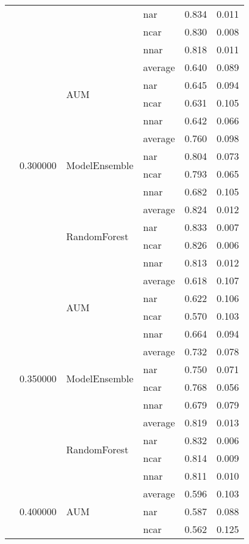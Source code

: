 \begin{longtable}{llllrr}
 &  &  & nar & 0.834 & 0.011 \\
 &  &  & ncar & 0.830 & 0.008 \\
 &  &  & nnar & 0.818 & 0.011 \\
\cline{2-6} \cline{3-6}
 & \multirow[t]{12}{*}{0.300000} & \multirow[t]{4}{*}{AUM} & average & 0.640 & 0.089 \\
 &  &  & nar & 0.645 & 0.094 \\
 &  &  & ncar & 0.631 & 0.105 \\
 &  &  & nnar & 0.642 & 0.066 \\
\cline{3-6}
 &  & \multirow[t]{4}{*}{ModelEnsemble} & average & 0.760 & 0.098 \\
 &  &  & nar & 0.804 & 0.073 \\
 &  &  & ncar & 0.793 & 0.065 \\
 &  &  & nnar & 0.682 & 0.105 \\
\cline{3-6}
 &  & \multirow[t]{4}{*}{RandomForest} & average & 0.824 & 0.012 \\
 &  &  & nar & 0.833 & 0.007 \\
 &  &  & ncar & 0.826 & 0.006 \\
 &  &  & nnar & 0.813 & 0.012 \\
\cline{2-6} \cline{3-6}
 & \multirow[t]{12}{*}{0.350000} & \multirow[t]{4}{*}{AUM} & average & 0.618 & 0.107 \\
 &  &  & nar & 0.622 & 0.106 \\
 &  &  & ncar & 0.570 & 0.103 \\
 &  &  & nnar & 0.664 & 0.094 \\
\cline{3-6}
 &  & \multirow[t]{4}{*}{ModelEnsemble} & average & 0.732 & 0.078 \\
 &  &  & nar & 0.750 & 0.071 \\
 &  &  & ncar & 0.768 & 0.056 \\
 &  &  & nnar & 0.679 & 0.079 \\
\cline{3-6}
 &  & \multirow[t]{4}{*}{RandomForest} & average & 0.819 & 0.013 \\
 &  &  & nar & 0.832 & 0.006 \\
 &  &  & ncar & 0.814 & 0.009 \\
 &  &  & nnar & 0.811 & 0.010 \\
\cline{2-6} \cline{3-6}
 & \multirow[t]{12}{*}{0.400000} & \multirow[t]{4}{*}{AUM} & average & 0.596 & 0.103 \\
 &  &  & nar & 0.587 & 0.088 \\
 &  &  & ncar & 0.562 & 0.125 \\

\end{longtable}
